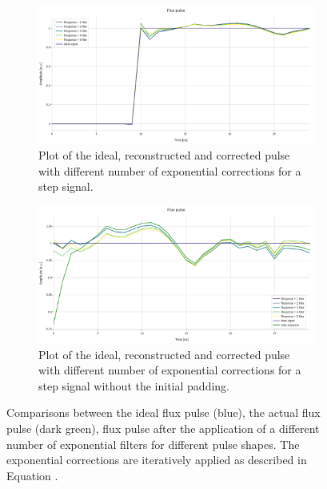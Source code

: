 \begin{figure}[h!]
    \centering
    \begin{subfigure}[t]{0.495\textwidth}
        \includegraphics[width=\textwidth]{figures/png/Cryoscope/filters/step_5_inverse.png}
        \caption{Plot of the ideal, reconstructed and corrected pulse with different number of exponential corrections for a step signal.}
        \label{fig:5inverse:step}
    \end{subfigure}
    \hfill
    \begin{subfigure}[t]{0.495\textwidth}
        \includegraphics[width=\textwidth]{figures/png/Cryoscope/filters/inverse_5_no_pad.png}
        \caption{Plot of the ideal, reconstructed and corrected pulse with different number of exponential corrections for a step signal without the initial padding.}
        \label{fig:5inverse:no_pad}
    \end{subfigure}
    
    \caption{Comparisons between the ideal flux pulse (blue), the actual flux pulse (dark green), flux pulse after the application of a different number of exponential filters for different pulse shapes.
    The exponential corrections are iteratively applied as described in Equation \label{eq:inverse}.}
    \label{fig:5inverse_short}
\end{figure}

